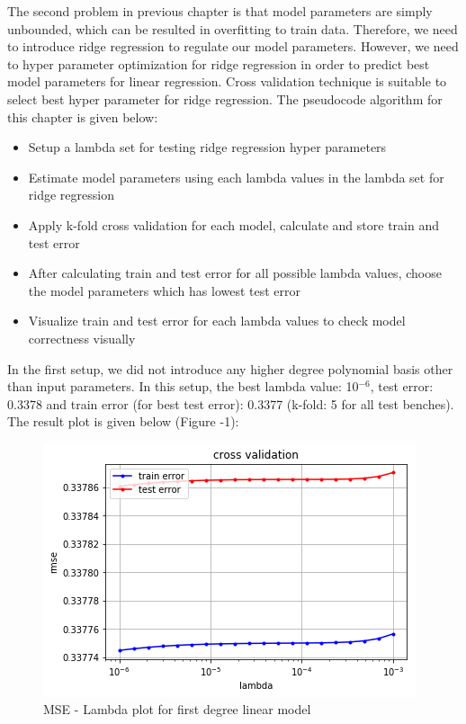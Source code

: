 \documentclass[10pt,conference,compsocconf]{IEEEtran}
\begin{document}
The second problem in previous chapter is that model parameters are 
simply unbounded, which can be resulted in overfitting to train data. 
Therefore, we need to introduce ridge regression to regulate our model 
parameters. However, we need to hyper parameter optimization for ridge 
regression in order to predict best model parameters for linear 
regression. Cross validation technique is suitable to select best hyper 
parameter for ridge regression. The pseudocode algorithm for this 
chapter is given below:

\begin{itemize}
\item Setup a lambda set for testing ridge regression hyper parameters
\item Estimate model parameters using each lambda values in the lambda 
set for ridge regression
\item Apply k-fold cross validation for each model, calculate and store 
train and test error
\item After calculating train and test error for all possible lambda 
values, choose the model parameters which has lowest test error
\item Visualize train and test error for each lambda values to check 
model correctness visually
\end{itemize}
In the first setup, we did not introduce any higher degree polynomial 
basis other than input parameters. In this setup, the best lambda value: 
10$^{-6}$, test error: 0.3378 and train error (for best test error): 
0.3377 (k-fold: 5 for all test benches). The result plot is given below 
(Figure -1):
\begin{center}
\begin{figure}[h]
\includegraphics[scale=0.5]{linear_1}
\centering
\caption{MSE - Lambda plot for first degree linear model}
\end{figure}
\end{center}
\end{document}
